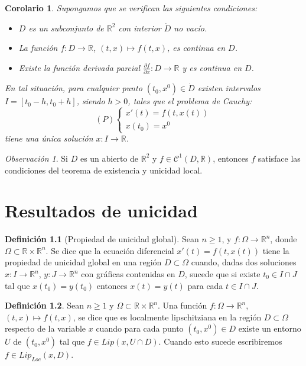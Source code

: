 \documentclass{report}
\newtheorem{corollary}[theorem]{Corolario}
\theoremstyle{remark}
\newtheorem*{remark}{Observación}
\theoremstyle{remark}
\theoremstyle{remark}
\theoremstyle{definition}
\newtheorem{definition}{Definición}[chapter]
\theoremstyle{definition}
\theoremstyle{definition}
\begin{document}
\begin{corollary}
    Supongamos que se verifican las siguientes condiciones:
    \begin{itemize}
        \item $D$ es un subconjunto de $\mathbb{R}^2$ con interior $\dot{D}$ no vacío.
        \item La función $f: D \to \mathbb{R}$, $(t, x) \mapsto f(t, x)$, es continua en $D$.
        \item Existe la función derivada parcial $\frac{\partial f}{\partial x}: D \to \mathbb{R}$ y es continua en $D$.
    \end{itemize}
    En tal situación, para cualquier punto $(t_0, x^0) \in \dot{D}$ existen intervalos $I = [t_0 - h, t_0 + h]$, siendo $h > 0$, tales que el problema de Cauchy:
    $$(P) \begin{cases}
            x'(t) = f(t, x(t)) \\
            x(t_0) = x^0
        \end{cases}$$
    tiene una única solución $x: I \to \mathbb{R}$.
\end{corollary}

\begin{remark}
    Si $D$ es un abierto de $\mathbb{R}^2$ y $f \in \mathcal{C}^1(D, \mathbb{R})$, entonces $f$ satisface las condiciones del teorema de existencia y unicidad local.
\end{remark}

\chapter{Resultados de unicidad}
\begin{definition}[Propiedad de unicidad global]
    Sean $n \geq 1$, y $f: \Omega \to \mathbb{R}^n$, donde $\Omega \subset \mathbb{R} \times \mathbb{R}^n$.
    Se dice que la ecuación diferencial $x'(t) = f(t, x(t))$ tiene la propiedad de unicidad global en una región $D \subset \Omega$ cuando, dadas dos soluciones $x: I \to \mathbb{R}^n$, $y: J \to \mathbb{R}^n$ con gráficas contenidas en $D$, sucede que si existe $t_0 \in I \cap J$ tal que $x(t_0) = y(t_0)$ entonces $x(t) = y(t)$ para cada $t \in I \cap J$.
\end{definition}

\begin{definition}
    Sean $n \geq 1$ y $\Omega \subset \mathbb{R} \times \mathbb{R}^n$.
    Una función $f: \Omega \to \mathbb{R}^n$, $(t, x) \mapsto f(t, x)$, se dice que es localmente lipschitziana en la región $D \subset \Omega$ respecto de la variable $x$ cuando para cada punto $(t_0, x^0) \in D$ existe un entorno $U$ de $(t_0, x^0)$ tal que $f \in Lip(x, U \cap D)$.
    Cuando esto sucede escribiremos $f \in Lip_{Loc}(x, D)$.
\end{definition}
\end{document}
